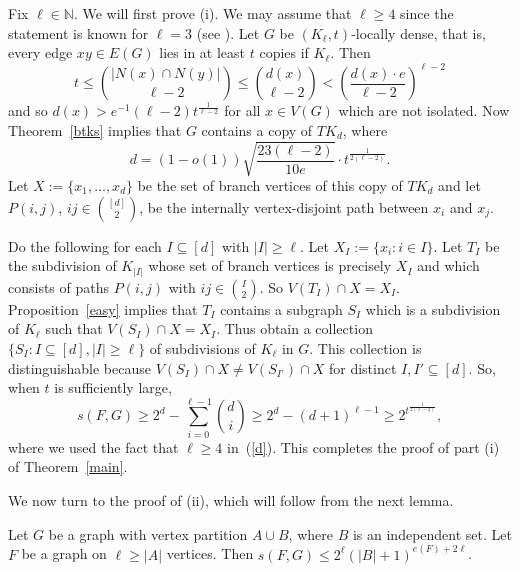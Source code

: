 \documentclass[12pt]{amsart}
\begin{document}
\medskip
\noindent
Fix $\ell \in \mathbb{N}$.
We will first prove (i).
We may assume that $\ell \geq 4$ since the statement is known for $\ell = 3$ (see \cite{tuza2}).
Let $G$ be $(K_\ell,t)$-locally dense, that is, every edge $xy \in E(G)$ lies in at least $t$ copies if $K_\ell$.
Then
\begin{equation}\label{degcount}
t \le \binom{|N(x) \cap N(y)|}{\ell-2}\le \binom{d(x)}{\ell-2} < \left( \frac{d(x) \cdot e}{\ell-2} \right)^{\ell-2}
\end{equation}
and so $d(x) > e^{-1}(\ell-2)t^{\frac{1}{\ell-2}}$ for all $x \in V(G)$ which are not isolated. Now Theorem~\ref{btks} implies that $G$ contains a copy of $TK_d$, where
\begin{equation}\label{d}
d = (1-o(1))\sqrt{\frac{23(\ell-2)}{10e}}\cdot t^{\frac{1}{2(\ell-2)}}.
\end{equation}
Let $X := \lbrace x_1,\ldots,x_d \rbrace$ be the set of branch vertices of this copy of $TK_d$ and let $P(i,j)$, $ij \in \binom{[d]}{2}$, be the internally vertex-disjoint path between $x_i$ and $x_j$.


Do the following for each $I \subseteq [d]$ with $|I| \geq \ell$.
Let $X_I := \lbrace x_i : i \in I \rbrace$.
Let $T_I$ be the subdivision of $K_{|I|}$ whose set of branch vertices is precisely $X_I$ and which consists of paths $P(i,j)$ with $ij \in \binom{I}{2}$.
So $V(T_I) \cap X = X_I$.
Proposition~\ref{easy} implies that $T_I$ contains a subgraph $S_I$ which is a subdivision of $K_\ell$ such that $V(S_I) \cap X = X_I$.
Thus obtain a collection $\lbrace S_I : I \subseteq [d], |I| \geq \ell \rbrace$ of subdivisions of $K_\ell$ in $G$.
This collection is distinguishable because $V(S_I) \cap X \neq V(S_{I'}) \cap X$ for distinct $I,I' \subseteq [d]$.
So, when $t$ is sufficiently large,
$$
s(F,G) \geq 2^d - \sum_{i=0}^{\ell-1} \binom{d}{i} \geq 2^d - (d+1)^{\ell-1} \geq 2^{t^{\frac{1}{2(\ell-2)}}},
$$
where we used the fact that $\ell \geq 4$ in~(\ref{d}).
This
completes the proof of part (i) of Theorem~\ref{main}.



\medskip
\noindent
We now turn to the proof of (ii), which will follow from the next lemma.

\begin{lemma}\label{semibip}
Let $G$ be a graph with vertex partition $A \cup B$, where $B$ is an independent set.
Let $F$ be a graph on $\ell \geq |A|$ vertices.
Then $s(F,G) \leq 2^{\ell} (|B|+1)^{e(F)+2\ell}$.
\end{lemma}
\end{document}
